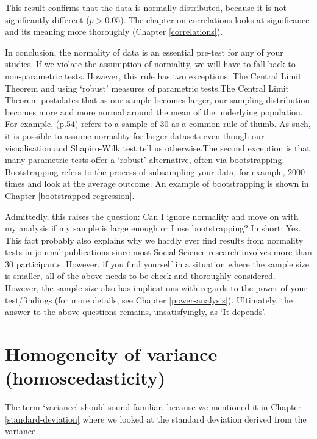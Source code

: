 \documentclass[
]{book}
\begin{document}
This result confirms that the data is normally distributed, because it is not significantly different (\(p > 0.05\)). The chapter on correlations looks at significance and its meaning more thoroughly (Chapter \ref{correlations}).

In conclusion, the normality of data is an essential pre-test for any of your studies. If we violate the assumption of normality, we will have to fall back to non-parametric tests. However, this rule has two exceptions: The Central Limit Theorem and using `robust' measures of parametric tests.The Central Limit Theorem postulates that as our sample becomes larger, our sampling distribution becomes more and more normal around the mean of the underlying population. For example, \citet{field2013discovering} (p.54) refers to a sample of 30 as a common rule of thumb. As such, it is possible to assume normality for larger datasets even though our visualisation and Shapiro-Wilk test tell us otherwise.The second exception is that many parametric tests offer a `robust' alternative, often via bootstrapping. Bootstrapping refers to the process of subsampling your data, for example, 2000 times and look at the average outcome. An example of bootstrapping is shown in Chapter \ref{bootstrapped-regression}.

Admittedly, this raises the question: Can I ignore normality and move on with my analysis if my sample is large enough or I use bootstrapping? In short: Yes. This fact probably also explains why we hardly ever find results from normality tests in journal publications since most Social Science research involves more than 30 participants. However, if you find yourself in a situation where the sample size is smaller, all of the above needs to be check and thoroughly considered. However, the sample size also has implications with regards to the power of your test/findings (for more details, see Chapter \ref{power-analysis}). Ultimately, the answer to the above questions remains, unsatisfyingly, as `It depends'.

\hypertarget{homogeneity-of-variance}{%
\section{Homogeneity of variance (homoscedasticity)}\label{homogeneity-of-variance}}

The term `variance' should sound familiar, because we mentioned it in Chapter \ref{standard-deviation} where we looked at the standard deviation derived from the variance.
\end{document}
